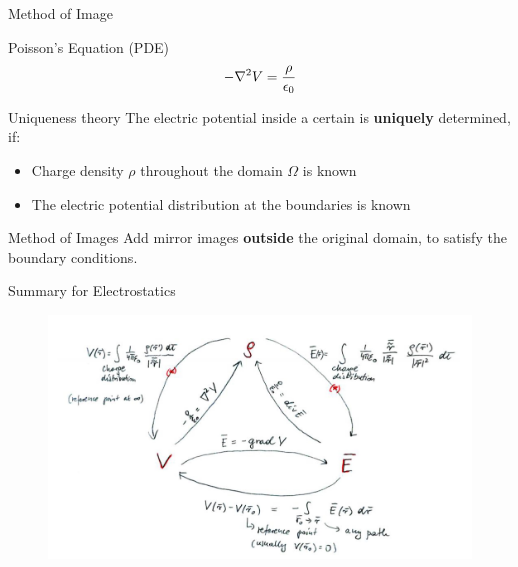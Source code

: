 \documentclass{beamer}
\begin{document}
\begin{frame}{Method of Image}
    \begin{block}{Poisson's Equation (PDE)}
        \begin{equation}
            - \laplacian{V} = \frac{\rho}{\epsilon_0}
        \end{equation}
    \end{block}

    \begin{block}{Uniqueness theory}
        The electric potential inside a certain is \textbf{uniquely} determined, if:
        \begin{itemize}
            \item Charge density $\rho$ throughout the domain $\Omega$ is known
            \item The electric potential distribution at the boundaries is known
        \end{itemize}
    \end{block}

    \begin{block}{Method of Images}
        Add mirror images \textbf{outside} the original domain, to satisfy the boundary conditions.
    \end{block}
    
\end{frame}

\begin{frame}{Summary for Electrostatics}
    \begin{figure}[htbp]
        \centering
        \includegraphics[width=\textwidth]{images/elec.jpg}
    \end{figure}
\end{frame}

\end{document}
